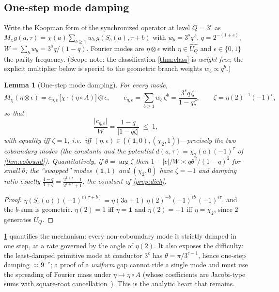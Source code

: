 \documentclass[11pt]{article}
\theoremstyle{plain}
\newtheorem{lemma}{Lemma}
\theoremstyle{definition}
\theoremstyle{remark}
\begin{document}
\subsection*{One-step mode damping}

Write the Koopman form of the synchronized operator at level $Q=3^c$ as
$M_\chi g(a,\tau)=\chi(a)\sum_{b\ge1}w_b\,g(S_b(a),\tau+b)$ with
$w_b=3^sq^{\,b}$, $q=2^{-(1+s)}$, $W=\sum_bw_b=3^sq/(1-q)$. Fourier modes are
$\eta\otimes\epsilon$ with $\eta\in\widehat{U_Q}$ and $\epsilon\in\{0,1\}$ the
parity frequency. (Scope note: the classification \cref{thm:class} is
\emph{weight-free}; the explicit multiplier below is special to the geometric
branch weights $w_b\propto q^b$.)

\begin{lemma}[One-step mode damping]\label{lem:damp}
For every mode,
\[
M_\chi(\eta\otimes\epsilon)=c_{\eta,\epsilon}\,\bigl[\chi\cdot(\eta\circ A)\bigr]\otimes\epsilon,
\qquad
c_{\eta,\epsilon}=\sum_{b\ge1}w_b\,\zeta^b=\frac{3^sq\,\zeta}{1-q\zeta},
\qquad
\zeta=\eta(2)^{-1}(-1)^{\epsilon},
\]
so that
\[
\frac{\lvert c_{\eta,\epsilon}\rvert}{W}
=\frac{1-q}{\lvert1-q\zeta\rvert}\;\le\;1,
\]
with equality iff $\zeta=1$, i.e.\ iff
$(\eta,\epsilon)\in\{(\mathbf1,0),(\chi_2,1)\}$---precisely the two coboundary
modes (the constants and the potential $d(a,\tau)=\chi_2(a)(-1)^\tau$ of
\cref{thm:cobound}). Quantitatively, if $\theta=\arg\zeta$ then
$1-\lvert c\rvert/W\asymp q\theta^2/(1-q)^2$ for small $\theta$; the
``swapped'' modes $(\mathbf1,1)$ and $(\chi_2,0)$ have $\zeta=-1$ and damping
ratio exactly $\frac{1-q}{1+q}=\frac{2^{1+s}-1}{2^{1+s}+1}$, the constant of
\cref{prop:dich}.
\end{lemma}
\begin{proof}
$\eta(S_b(a))(-1)^{\epsilon(\tau+b)}
=\eta(3a+1)\,\eta(2)^{-b}(-1)^{\epsilon b}\,(-1)^{\epsilon\tau}$, and the $b$-sum
is geometric. $\eta(2)=1$ iff $\eta=\mathbf1$ and $\eta(2)=-1$ iff $\eta=\chi_2$,
since $2$ generates $U_Q$.
\end{proof}

\noindent\cref{lem:damp} quantifies the mechanism: every non-coboundary mode is
strictly damped in one step, at a rate governed by the angle of $\eta(2)$. It
also exposes the difficulty: the least-damped primitive mode at conductor $3^c$
has $\theta=\pi/3^{c-1}$, hence one-step damping $\asymp9^{-c}$; a proof of a
\emph{uniform} gap cannot ride a single mode and must use the spreading of
Fourier mass under $\eta\mapsto\eta\circ A$ (whose coefficients are Jacobi-type
sums with square-root cancellation~\cite{bew1998}). This is the analytic heart that remains.
\end{document}
